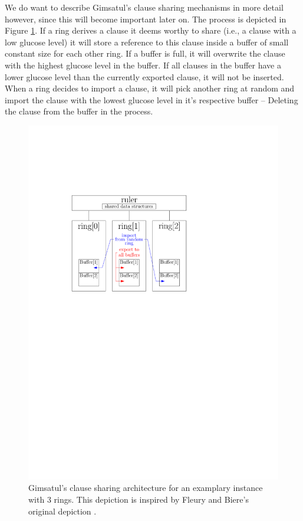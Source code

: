 \documentclass[12pt,a4paper,twoside]{scrartcl}
\numberwithin{equation}{section}
\begin{document}
We do want to describe Gimsatul's clause sharing mechanisms in more detail however, since this will become important later on. The process is depicted in Figure \ref{fig:architectureGimsatul}. If a ring derives a clause it deems worthy to share (i.e., a clause with a low glucose level) it will store a reference to this clause inside a buffer of small constant size for each other ring. If a buffer is full, it will overwrite the clause with the highest glucose level in the buffer. If all clauses in the buffer have a lower glucose level than the currently exported clause, it will not be inserted. When a ring decides to import a clause, it will pick another ring at random and import the clause with the lowest glucose level in it's respective buffer -- Deleting the clause from the buffer in the process.

\begin{figure}
  \center
  \includegraphics[]{figures/gimsatul_architecture.pdf}
  \caption{Gimsatul's clause sharing architecture for an examplary instance with 3 rings. This depiction is inspired by Fleury and Biere's original depiction \cite{gimsatul}.}
  \label{fig:architectureGimsatul}
\end{figure}
\end{document}
